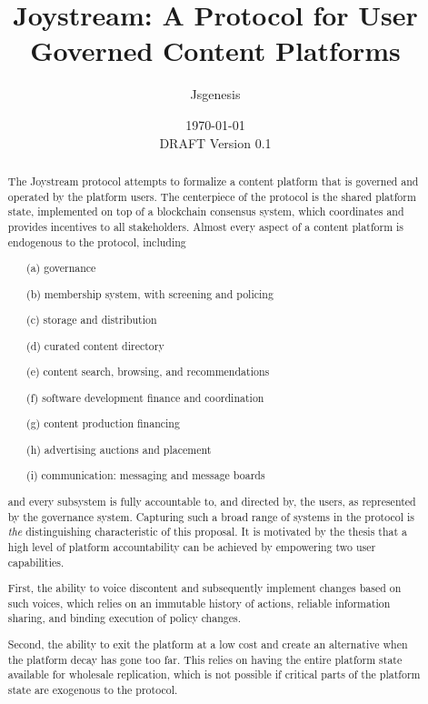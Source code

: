 \documentclass{article}
\begin{document}
%
\title{
\textbf{
Joystream: A Protocol for User Governed Content Platforms
}
}
%
%

\author{Jsgenesis}

\date{\today \\ DRAFT Version 0.1}

\maketitle              %


%
\begin{abstract}

The Joystream protocol attempts to formalize a content platform that is governed and operated by the platform users. The centerpiece of the protocol is the shared platform state, implemented on top of a blockchain consensus system, which coordinates and provides incentives to all stakeholders. Almost every aspect of a content platform is endogenous to the protocol, including

    \begin{itemize}
        \item[(a)] {governance}
        \item[(b)] {membership system, with screening and policing}
        \item[(c)] {storage and distribution}
        \item[(d)] {curated content directory}
        \item[(e)] {content search, browsing, and recommendations}
        \item[(f)] {software development finance and coordination}
        \item[(g)] {content production financing}
        \item[(h)] {advertising auctions and placement}
        \item[(i)] {communication: messaging and message boards}
    \end{itemize}

and every subsystem is fully accountable to, and directed by, the users, as represented by the governance system. Capturing such a broad range of systems in the protocol is \textit{the} distinguishing characteristic of this proposal. It is motivated by the thesis that a high level of platform accountability can be achieved by empowering two user capabilities.

First, the ability to voice discontent and subsequently implement changes based on such voices, which relies on an immutable history of actions, reliable information sharing, and binding execution of policy changes.

Second, the ability to exit the platform at a low cost and create an alternative when the platform decay has gone too far. This relies on having the entire platform state available for wholesale replication, which is not possible if critical parts of the platform state are exogenous to the protocol.

\end{abstract}
\end{document}
